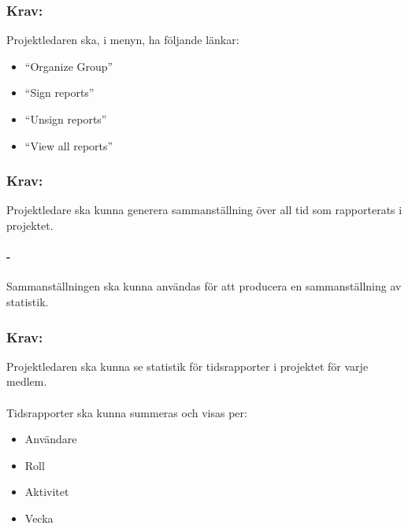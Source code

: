 \documentclass[paper=a4, fontsize=11pt,twoside]{article}
\begin{document}
\paragraph{}

\subsubsection{Krav:}
 Projektledaren ska, i menyn, ha följande länkar:
 \begin{itemize}
 \item “Organize Group”
 \item “Sign reports”
 \item “Unsign reports”
 \item “View all reports”
 \end{itemize}

\paragraph{}

\subsubsection{Krav:}
Projektledare ska kunna generera sammanställning över all tid som rapporterats i projektet.
\paragraph{-}
Sammanställningen ska kunna användas för att producera en sammanställning av statistik.

\newpage
\subsubsection{Krav:}
Projektledaren ska kunna se statistik för tidsrapporter i projektet för varje medlem.
\paragraph{}
Tidsrapporter ska kunna summeras och visas per:
\begin{itemize}
\item Användare
\item Roll
\item Aktivitet
\item Vecka
\end{itemize}
\end{document}
